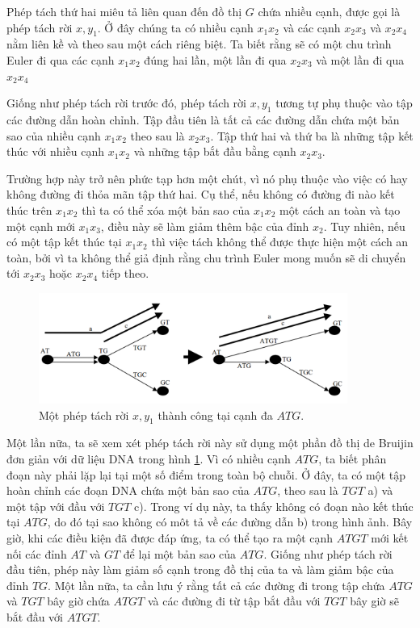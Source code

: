 \documentclass[14pt, a4paper]{article}
\numberwithin{equation}{section}
\numberwithin{figure}{section}
\numberwithin{dl}{section}
\numberwithin{md}{section}
\numberwithin{bd}{section}
\numberwithin{dn}{section}
\numberwithin{hq}{section}
\begin{document}
    Phép tách thứ hai miêu tả liên quan đến đồ thị $G$ chứa nhiều cạnh, được gọi là phép tách rời $x, y_1$.
    Ở đây chúng ta có nhiều cạnh $x_1 x_2$ và các cạnh $x_2 x_3$ và $x_2 x_4$ nằm liên kề và theo sau một cách riêng biệt.
    Ta biết rằng sẽ có một chu trình Euler đi qua các cạnh $x_1 x_2$ đúng hai lần, một lần đi qua $x_2 x_3$ và một lần đi qua $x_2 x_4$

    Giống như phép tách rời trước đó, phép tách rời $x, y_1$ tương tự phụ thuộc vào tập các đường dẫn hoàn chỉnh.
    Tập đầu tiên là tất cả các đường dẫn chứa một bản sao của nhiều cạnh $x_1 x_2$ theo sau là $x_2 x_3$.
    Tập thứ hai và thứ ba là những tập kết thúc với nhiều cạnh $x_1 x_2$ và những tập bắt đầu bằng cạnh $x_2 x_3$.

    Trường hợp này trở nên phức tạp hơn một chút, vì nó phụ thuộc vào việc có hay không đường đi thỏa mãn tập thứ hai.
    Cụ thể, nếu không có đường đi nào kết thúc trên $x_1 x_2$ thì ta có thể xóa một bản sao của $x_1 x_2$ một cách an toàn và tạo một cạnh mới $x_1 x_3$, điều này sẽ làm giảm thêm bậc của đỉnh $x_2$.
    Tuy nhiên, nếu có một tập kết thúc tại $x_1 x_2$ thì việc tách không thể được thực hiện một cách an toàn, bởi vì ta không thể giả định rằng chu trình Euler mong muốn sẽ di chuyển tới $x_2 x_3$ hoặc $x_2 x_4$ tiếp theo.

    \begin{figure}[h!]
        \centering
        \includegraphics[width=0.9\textwidth]{7.png}
        \caption{Một phép tách rời $x, y_1$ thành công tại cạnh đa $ATG$.}
        \label{fig:7}
    \end{figure}

    Một lần nữa, ta sẽ xem xét phép tách rời này sử dụng một phần đồ thị de Bruijin đơn giản với dữ liệu DNA trong hình \ref{fig:7}.
    Vì có nhiều cạnh $ATG$, ta biết phân đoạn này phải lặp lại tại một số điểm trong toàn bộ chuỗi. Ở đây, ta có một tập hoàn chỉnh các đoạn DNA chứa một bản sao của $ATG$, theo sau là $TGT$ a) và một tập với đầu với $TGT$ c).
    Trong ví dụ này, ta thấy không có đoạn nào kết thúc tại $ATG$, do đó tại sao không có môt tả về các đường dẫn b) trong hình ảnh.
    Bây giờ, khi các điều kiện đã được đáp ứng, ta có thể tạo ra một cạnh $ATGT$ mới kết nối các đỉnh $AT$ và $GT$ để lại một bản sao của $ATG$.
    Giống như phép tách rời đầu tiên, phép này làm giảm số cạnh  trong đồ thị của ta và làm giảm bậc của đỉnh $TG$.
    Một lần nữa, ta cần lưu ý rằng tất cả các đường đi trong tập chứa $ATG$ và $TGT$ bây giờ chứa $ATGT$ và các đường đi từ tập bắt đầu với $TGT$ bây giờ sẽ bắt đầu với $ATGT$.
\end{document}
